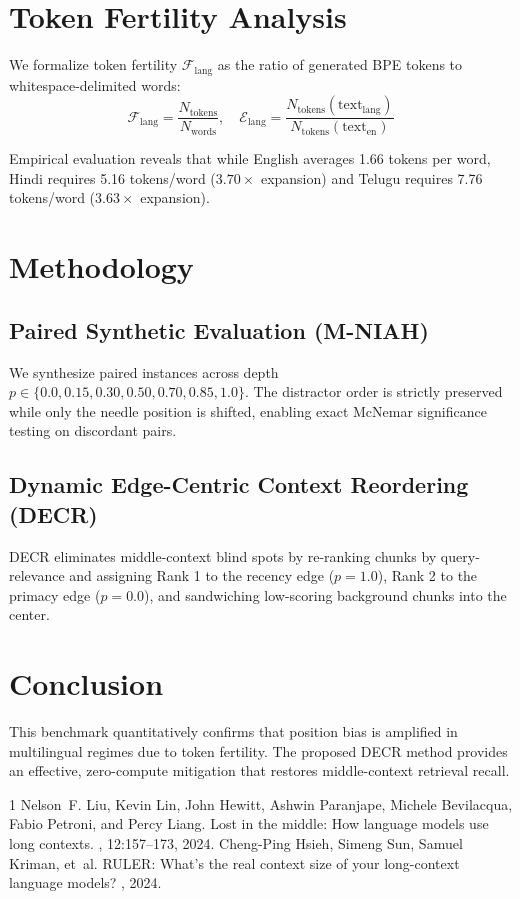 \documentclass[11pt,a4paper]{article}
\begin{document}
\section{Token Fertility Analysis}
We formalize token fertility $\mathcal{F}_{\text{lang}}$ as the ratio of generated BPE tokens to whitespace-delimited words:
\begin{equation}
\mathcal{F}_{\text{lang}} = \frac{N_{\text{tokens}}}{N_{\text{words}}}, \quad \mathcal{E}_{\text{lang}} = \frac{N_{\text{tokens}}(\text{text}_{\text{lang}})}{N_{\text{tokens}}(\text{text}_{\text{en}})}
\end{equation}



Empirical evaluation reveals that while English averages 1.66 tokens per word, Hindi requires 5.16 tokens/word ($3.70\times$ expansion) and Telugu requires 7.76 tokens/word ($3.63\times$ expansion).

\section{Methodology}
\subsection{Paired Synthetic Evaluation (M-NIAH)}
We synthesize paired instances across depth $p \in \{0.0, 0.15, 0.30, 0.50, 0.70, 0.85, 1.0\}$. The distractor order is strictly preserved while only the needle position is shifted, enabling exact McNemar significance testing on discordant pairs.

\subsection{Dynamic Edge-Centric Context Reordering (DECR)}
DECR eliminates middle-context blind spots by re-ranking chunks by query-relevance and assigning Rank 1 to the recency edge ($p=1.0$), Rank 2 to the primacy edge ($p=0.0$), and sandwiching low-scoring background chunks into the center.

\section{Conclusion}
This benchmark quantitatively confirms that position bias is amplified in multilingual regimes due to token fertility. The proposed DECR method provides an effective, zero-compute mitigation that restores middle-context retrieval recall.


\begin{thebibliography}{1}
Nelson~F. Liu, Kevin Lin, John Hewitt, Ashwin Paranjape, Michele Bevilacqua, Fabio Petroni, and Percy Liang.
\newblock Lost in the middle: How language models use long contexts.
, 12:157--173, 2024.
Cheng-Ping Hsieh, Simeng Sun, Samuel Kriman, et~al.
\newblock RULER: What's the real context size of your long-context language models?
, 2024.
\end{thebibliography}
\end{document}
